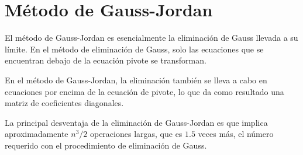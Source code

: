\section{Método de Gauss-Jordan}
El método de Gauss-Jordan es esencialmente la eliminación de Gauss llevada a su límite. En el método de eliminación de Gauss, solo las ecuaciones que se encuentran debajo de la ecuación pivote se transforman.
\par
En el método de Gauss-Jordan, la eliminación también se lleva a cabo en ecuaciones por encima de la ecuación de pivote, lo que da como resultado una matriz de coeficientes diagonales.
\par
La principal desventaja de la eliminación de Gauss-Jordan es que implica aproximadamente $n^{3}/2$ operaciones largas, que es $1.5$ veces más, el número requerido con el procedimiento de eliminación de Gauss.

